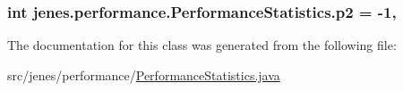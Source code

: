 \hypertarget{classjenes_1_1performance_1_1_performance_statistics_adaa717c633db9580fd123aa32d4feac6}{
\subsubsection[{p2}]{\setlength{\rightskip}{0pt plus 5cm}int jenes.\-performance.\-Performance\-Statistics.\-p2 = -\/1\hspace{0.3cm}{\ttfamily [static]}, {\ttfamily [private]}}}\label{classjenes_1_1performance_1_1_performance_statistics_adaa717c633db9580fd123aa32d4feac6}


The documentation for this class was generated from the following file\-:\begin{DoxyCompactItemize}
\item 
src/jenes/performance/\hyperlink{_performance_statistics_8java}{Performance\-Statistics.\-java}\end{DoxyCompactItemize}
